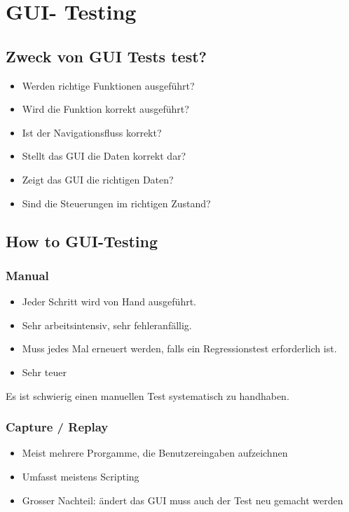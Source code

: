\documentclass[a4paper,10pt]{article}
\begin{document}




\pagebreak
\section{GUI- Testing}
\subsection{Zweck von GUI Tests test?}
\begin{itemize}
\item Werden richtige Funktionen ausgeführt?
\item Wird die Funktion korrekt ausgeführt?
\item Ist der Navigationsfluss korrekt?
\item Stellt das GUI die Daten korrekt dar?
\item Zeigt das GUI die richtigen Daten?
\item Sind die Steuerungen im richtigen Zustand?
\end{itemize}

\subsection{How to GUI-Testing}
\subsubsection{Manual}
\begin{itemize}
\item Jeder Schritt wird von Hand ausgeführt.
\item Sehr arbeitsintensiv, sehr fehleranfällig.
\item Muss jedes Mal erneuert werden, falls ein Regressionstest erforderlich ist.
\item Sehr teuer
\end{itemize}
Es ist schwierig einen manuellen Test systematisch zu handhaben.

\subsubsection{Capture / Replay}
\begin{itemize}
\item Meist mehrere Prorgamme, die Benutzereingaben aufzeichnen
\item Umfasst meistens Scripting
\item Grosser Nachteil: ändert das GUI muss auch der Test neu gemacht werden
\end{itemize}
\end{document}
